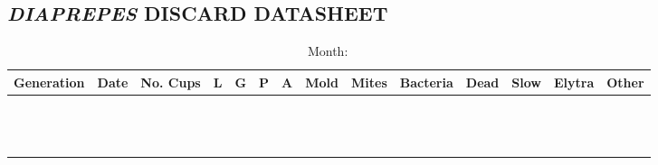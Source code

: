 \documentclass{sop_class}[overrideChapters] %
\begin{document}
{\begin{landscape}
\section{\textit{DIAPREPES} DISCARD DATASHEET}\label{discard-datasheet}
\begin{table}[!htbp]
    \centering
    \setlength{\tabcolsep}{0.5em}
      \begin{threeparttable}
        \caption*{Month$\colon$}
              \begin{tabular}{|c|c|c|c|c|c|c|c|c|c|c|c|c|c|}
            \toprule
            \hline
            {Generation} & {Date} & {No. Cups} & {L} & {G} & {P} & {A} & {Mold} & {Mites} & {Bacteria} & {Dead} & {Slow} & {Elytra} & {Other}\\
            \hline
            {} & {} & {} & {} & {} & {} & {} & {} & {} & {} & {} & {} & {} & {}\\
            \hline
            {} & {} & {} & {} & {} & {} & {} & {} & {} & {} & {} & {} & {} & {}\\
            \hline
            {} & {} & {} & {} & {} & {} & {} & {} & {} & {} & {} & {} & {} & {}\\
            \hline
            {} & {} & {} & {} & {} & {} & {} & {} & {} & {} & {} & {} & {} & {}\\
            \hline
            {} & {} & {} & {} & {} & {} & {} & {} & {} & {} & {} & {} & {} & {}\\
            \hline
            {} & {} & {} & {} & {} & {} & {} & {} & {} & {} & {} & {} & {} & {}\\
            \hline
            {} & {} & {} & {} & {} & {} & {} & {} & {} & {} & {} & {} & {} & {}\\
            \hline
            {} & {} & {} & {} & {} & {} & {} & {} & {} & {} & {} & {} & {} & {}\\
            \hline
            {} & {} & {} & {} & {} & {} & {} & {} & {} & {} & {} & {} & {} & {}\\
            \hline
            {} & {} & {} & {} & {} & {} & {} & {} & {} & {} & {} & {} & {} & {}\\
            \hline
            {} & {} & {} & {} & {} & {} & {} & {} & {} & {} & {} & {} & {} & {}\\
            \hline
            {} & {} & {} & {} & {} & {} & {} & {} & {} & {} & {} & {} & {} & {}\\
            \hline
            {} & {} & {} & {} & {} & {} & {} & {} & {} & {} & {} & {} & {} & {}\\

\end{tabular}
\end{threeparttable}
\end{table}
\end{landscape}}
\end{document}
